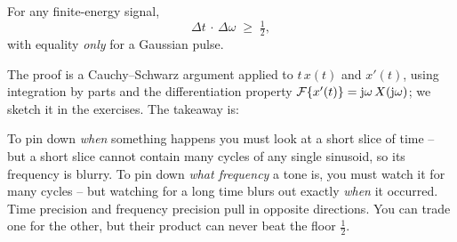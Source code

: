 \begin{theorem}
\label{ch07:thm-uncertainty}
For any finite-energy signal,
\begin{equation}
\Delta t \,\cdot\, \Delta\omega \;\ge\; \tfrac{1}{2},
\end{equation}
with equality \emph{only} for a Gaussian pulse.
\end{theorem}

The proof is a Cauchy--Schwarz argument applied to $t\,x(t)$ and $x'(t)$, using
integration by parts and the differentiation property $\mathcal{F}\{x'(t)\} = \mathrm{j}\omega\,X(\mathrm{j}\omega)$;
we sketch it in the exercises. The takeaway is:

\begin{intuitionbox}
To pin down \emph{when} something happens you must look at a short slice of time -- but a
short slice cannot contain many cycles of any single sinusoid, so its frequency is
blurry. To pin down \emph{what frequency} a tone is, you must watch it for many cycles --
but watching for a long time blurs out exactly \emph{when} it occurred. Time precision
and frequency precision pull in opposite directions. You can trade one for the other, but their
product can never beat the floor $\tfrac12$.
\end{intuitionbox}


